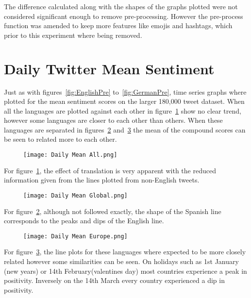 \noindent The difference calculated along with the shapes of the graphs plotted were not considered significant enough to remove pre-processing.
However the pre-process function was amended to keep more features like emojis and hashtags, which prior to this experiment where being removed.

\section{Daily Twitter Mean Sentiment}

Just as with figures~\ref{fig:EnglishPre} to~\ref{fig:GermanPre}, time series graphs where plotted for the mean sentiment scores on the larger 180,000 tweet dataset.
When all the languages are plotted against each other in figure~\ref{fig:globalall} show no clear trend, however some languages are closer to each other than others.
When these languages are separated in figures~\ref{fig:globalmean} and~\ref{fig:globaleu} the mean of the compound scores can be seen to related more to each other.

\begin{figure}[h!]
\texttt{[image: Daily Mean All.png]}
\caption[Daily Mean All]{ }
\label{fig:globalall}
\end{figure}

\noindent For figure~\ref{fig:globalall}, the effect of translation is very apparent with the reduced information given from the lines plotted from non-English tweets.

\begin{figure}[h!]
\texttt{[image: Daily Mean Global.png]}
\caption[Daily Mean Global]{ }
\label{fig:globalmean}
\end{figure}

\noindent For figure~\ref{fig:globalmean}, although not followed exactly, the shape of the Spanish line corresponds to the peaks and dips of the English line.

\begin{figure}[h!]
\texttt{[image: Daily Mean Europe.png]}
\caption[Daily Mean Europe]{ }
\label{fig:globaleu}
\end{figure}

\noindent For figure~\ref{fig:globaleu}, the line plots for these languages where expected to be more closely related however some similarities can be seen.
On holidays such as 1st January (new years) or 14th February(valentines day) most countries experience a peak in positivity.
Inversely on the 14th March every country experienced a dip in positivity.

